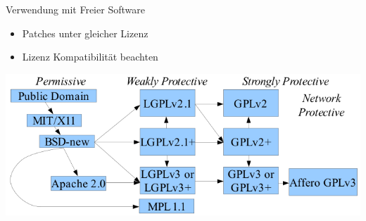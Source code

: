 \begin{frame}{Verwendung mit Freier Software}
	\begin{itemize}
		\item Patches unter gleicher Lizenz
		\item Lizenz Kompatibilität beachten
	\end{itemize}
	\begin{center}
		\includegraphics[width=\textwidth]{res/floss-license-compability.png}
	\end{center}
\end{frame}

